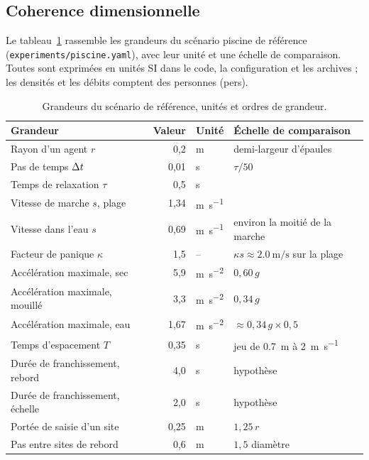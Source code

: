 \subsection{Coherence dimensionnelle}
\label{sec:dimensions}

Le tableau~\ref{tab:grandeurs} rassemble les grandeurs du scénario piscine de
référence (\texttt{experiments/piscine.yaml}), avec leur unité et une échelle de
comparaison. Toutes sont exprimées en unités SI dans le code, la configuration
et les archives ; les densités et les débits comptent des personnes (pers).

\begin{table}[ht]
\centering
\caption{Grandeurs du scénario de référence, unités et ordres de grandeur.}
\label{tab:grandeurs}
\small
\begin{tabular}{p{5.4cm}rlp{4.4cm}}
\toprule
Grandeur & Valeur & Unité & Échelle de comparaison \\
\midrule
Rayon d'un agent $r$ & 0,2 & \si{\metre} & demi-largeur d'épaules \\
Pas de temps $\Delta t$ & 0,01 & \si{\second} & $\tau/50$ \\
Temps de relaxation $\tau$ & 0,5 & \si{\second} & \cite{helbing2000} \\
Vitesse de marche $s$, plage & 1,34 & \si{\metre\per\second} & \cite{weidmann1993} \\
Vitesse dans l'eau $s$ & 0,69 & \si{\metre\per\second} & environ la moitié de la marche \\
Facteur de panique $\kappa$ & 1,5 & -- & $\kappa s\approx\SI{2.0}{\metre\per\second}$ sur la plage \\
Accélération maximale, sec & 5,9 & \si{\metre\per\second\squared} & $0{,}60\,g$ \\
Accélération maximale, mouillé & 3,3 & \si{\metre\per\second\squared} & $0{,}34\,g$ \\
Accélération maximale, eau & 1,67 & \si{\metre\per\second\squared} & $\approx 0{,}34\,g\times 0{,}5$ \\
Temps d'espacement $T$ & 0,35 & \si{\second} & jeu de \SI{0.7}{\metre} à \SI{2}{\metre\per\second} \\
Durée de franchissement, rebord & 4,0 & \si{\second} & hypothèse \\
Durée de franchissement, échelle & 2,0 & \si{\second} & hypothèse \\
Portée de saisie d'un site & 0,25 & \si{\metre} & $1{,}25\,r$ \\
Pas entre sites de rebord & 0,6 & \si{\metre} & $1{,}5$ diamètre \\

\end{tabular}
\end{table}
